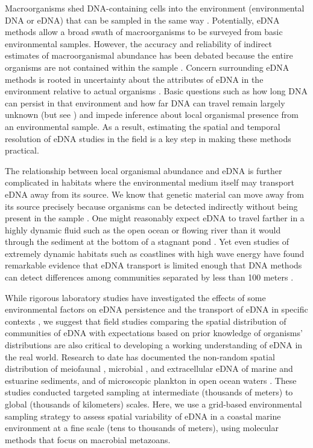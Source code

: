\documentclass[11pt,letterpaper]{article} %
\begin{document}
Macroorganisms shed DNA-containing cells into the environment (environmental DNA or eDNA) that can be sampled in the same way  \citep{Ficetola2008,Thomsen2012}. Potentially, eDNA methods allow a broad swath of macroorganisms to be surveyed from basic environmental samples. However, the accuracy and reliability of indirect estimates of macroorganismal abundance has been debated because the entire organisms are not contained within the sample \citep{Cowart2015}. Concern surrounding eDNA methods is rooted in uncertainty about the attributes of eDNA in the environment relative to actual organisms \citep{Shelton2016, Evans2016}. Basic questions such as how long DNA can persist in that environment and how far DNA can travel remain largely unknown (but see \cite{Klymus2015,Turner2015,Strickler2015,Deiner2014}) and impede inference about local organismal presence from an environmental sample. As a result, estimating the spatial and temporal resolution of eDNA studies in the field is a key step in making these methods practical.


The relationship between local organismal abundance and eDNA is further complicated in habitats where the environmental medium itself may transport eDNA away from its source. We know that genetic material can move away from its source precisely because organisms can be detected indirectly without being present in the sample \citep{Kelly2016}. One might reasonably expect eDNA to travel farther in a highly dynamic fluid such as the open ocean or flowing river than it would through the sediment at the bottom of a stagnant pond \citep{Deiner2014, Shogren2016}. Yet even studies of extremely dynamic habitats such as coastlines with high wave energy have found remarkable evidence that eDNA transport is limited enough that DNA methods can detect differences among communities separated by less than 100 meters \citep{Port2016}.


While rigorous laboratory studies have investigated the effects of some environmental factors on eDNA persistence \citep{Klymus2015, Barnes2014, Sassoubre2016} and the transport of eDNA in specific contexts \citep{Deiner2014}, we suggest that field studies comparing the spatial distribution of communities of eDNA with expectations based on prior knowledge of organisms' distributions are also critical to developing a working understanding of eDNA in the real world.
Research to date has documented the non-random spatial distribution of %
meiofaunal \citep{Fonseca2014,Guardiola2016}, microbial \citep{Lallias2015}, and extracellular \citep{Guardiola2015} eDNA of marine and estuarine sediments, and of microscopic plankton in open ocean waters \citep{DeVargas2015}.
These studies conducted targeted sampling at intermediate (thousands of meters) to global (thousands of kilometers) scales.
Here, we use a grid-based environmental sampling strategy to assess spatial variability of eDNA in a coastal marine environment at a fine scale (tens to thousands of meters), using molecular methods that focus on macrobial metazoans.
\end{document}
